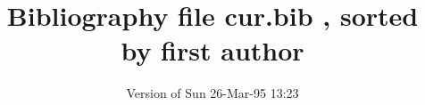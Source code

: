 
    
    \title{Bibliography file cur.bib , sorted by first author}
    \author{Version of Sun 26-Mar-95 13:23}
    \maketitle
    \renewcommand\thebibliography[1]{\section*{Bibliography\markboth
      {BIBLIOGRAPHY}{BIBLIOGRAPHY}}\list
      {[\arabic{enumi}]}{\settowidth\labelwidth{12345678}\leftmargin\labelwidth
	\advance\leftmargin\labelsep
	\usecounter{enumi}}
	\def\newblock{\hskip .11em plus .33em minus -.07em}
	\sloppy
        \sfcode`\.=1000\relax}

    
    
    

